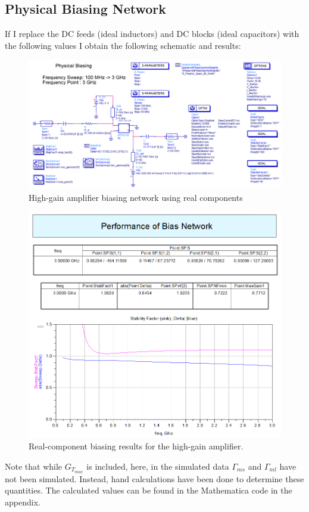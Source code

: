 \subsection{Physical Biasing Network}
If I replace the DC feeds (ideal inductors) and DC blocks (ideal capacitors)
with the following values I obtain the following schematic and results:

\begin{figure}[H]
    \centering
    \includegraphics[width=0.8\linewidth]{Images/A2P1PhysicalSchematic.png}
    \caption{High-gain amplifier biasing network using real components}
    \label{fig:A2P1PhysicalSchematic}
\end{figure}

\begin{figure}[H]
    \centering
    \includegraphics[width=0.8\linewidth]{Images/A2P1PhysicalBiasingResults.png}
    \caption{Real-component biasing results for the high-gain amplifier.}
    \label{fig:A2P1PhysicalBiasingResults}
\end{figure}

Note that while $G_{T_{max}}$ is included, here, in the simulated data
$\Gamma_{ms}$ and $\Gamma_{ml}$ have not been simulated. Instead, hand
calculations have been done to determine these quantities. The calculated values
can be found in the Mathematica code in the appendix.

